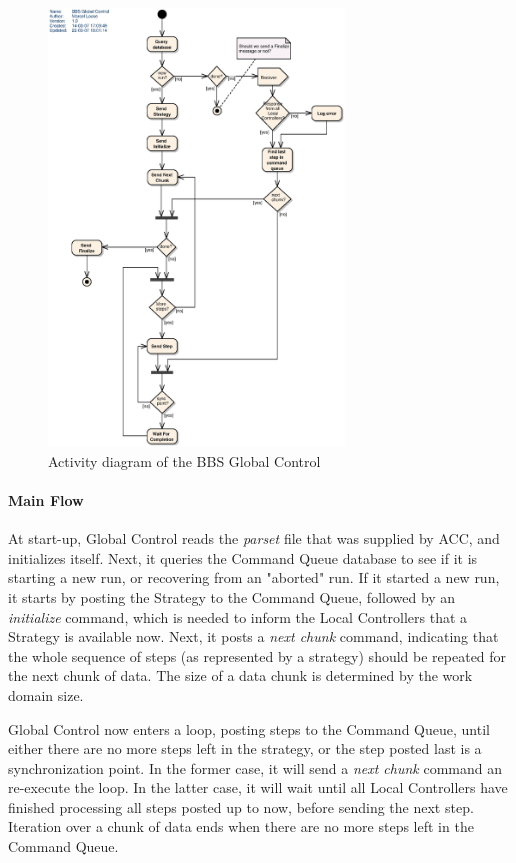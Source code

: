 \documentclass[10pt]{lofar}
\begin{document}
\begin{figure}[!ht]
\centering
\includegraphics[width=0.7\textwidth]{images/bbs-global-control-activity-diagram}
\caption{Activity diagram of the BBS Global Control}
\label{fig:global-control-activity-diagram}
\end{figure}

\paragraph*{Main Flow}
At start-up, Global Control reads the \emph{parset} file that was supplied by
ACC, and initializes itself. Next, it queries the Command Queue database to
see if it is starting a new run, or recovering from an "aborted" run. If it
started a new run, it starts by posting the Strategy to the Command Queue,
followed by an \textit{initialize} command, which is needed to inform the
Local Controllers that a Strategy is available now. Next, it posts a
\textit{next chunk} command, indicating that the whole sequence of steps (as
represented by a strategy) should be repeated for the next chunk of data. The
size of a data chunk is determined by the work domain size.

Global Control now enters a loop, posting steps to the Command Queue, until
either there are no more steps left in the strategy, or the step posted last
is a synchronization point. In the former case, it will send a \textit{next
chunk} command an re-execute the loop. In the latter case, it will wait until
all Local Controllers have finished processing all steps posted up to now,
before sending the next step. Iteration over a chunk of data ends when there
are no more steps left in the Command Queue.
\end{document}
